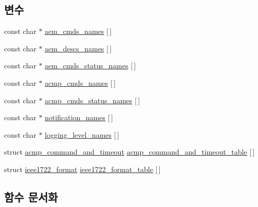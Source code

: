 \subsection*{변수}
\begin{DoxyCompactItemize}
\item 
const char $\ast$ \hyperlink{namespaceavdecc__lib_1_1utility_af0c1057de627c1dae00680009dc11782}{aem\+\_\+cmds\+\_\+names} \mbox{[}$\,$\mbox{]}
\item 
const char $\ast$ \hyperlink{namespaceavdecc__lib_1_1utility_a955f5e9abfcb9e061107640d8afbed23}{aem\+\_\+descs\+\_\+names} \mbox{[}$\,$\mbox{]}
\item 
const char $\ast$ \hyperlink{namespaceavdecc__lib_1_1utility_a18e2c784f81334113396eb2913112144}{aem\+\_\+cmds\+\_\+status\+\_\+names} \mbox{[}$\,$\mbox{]}
\item 
const char $\ast$ \hyperlink{namespaceavdecc__lib_1_1utility_a7b55d80ea9effb96c18b17ee15778444}{acmp\+\_\+cmds\+\_\+names} \mbox{[}$\,$\mbox{]}
\item 
const char $\ast$ \hyperlink{namespaceavdecc__lib_1_1utility_a7c11cd6ddc78496fe044bea68ac1fef9}{acmp\+\_\+cmds\+\_\+status\+\_\+names} \mbox{[}$\,$\mbox{]}
\item 
const char $\ast$ \hyperlink{namespaceavdecc__lib_1_1utility_a0ac9ebfa3d02f075ec4fbfc360dae4ee}{notification\+\_\+names} \mbox{[}$\,$\mbox{]}
\item 
const char $\ast$ \hyperlink{namespaceavdecc__lib_1_1utility_a214ecdfb4244fd3e0afd0e5a6a81606f}{logging\+\_\+level\+\_\+names} \mbox{[}$\,$\mbox{]}
\item 
struct \hyperlink{structavdecc__lib_1_1utility_1_1acmp__command__and__timeout}{acmp\+\_\+command\+\_\+and\+\_\+timeout} \hyperlink{namespaceavdecc__lib_1_1utility_a4b62d8a155f4c1e1f99fe7ddd1cf99e1}{acmp\+\_\+command\+\_\+and\+\_\+timeout\+\_\+table} \mbox{[}$\,$\mbox{]}
\item 
struct \hyperlink{structavdecc__lib_1_1utility_1_1ieee1722__format}{ieee1722\+\_\+format} \hyperlink{namespaceavdecc__lib_1_1utility_afacbef2365ebe76b1db6fef5f126e3f1}{ieee1722\+\_\+format\+\_\+table} \mbox{[}$\,$\mbox{]}
\end{DoxyCompactItemize}


\subsection{함수 문서화}
